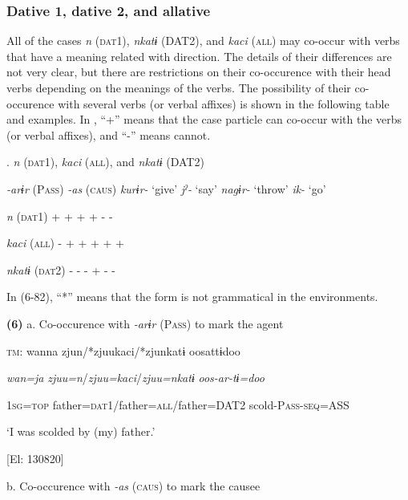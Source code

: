\subsubsection{Dative 1, dative 2, and allative}

All of the cases \textit{n} (\textsc{dat}1), \textit{nkatɨ} (DAT2), and \textit{kaci} (\textsc{all}) may co-occur with verbs that have a meaning related with direction. The details of their differences are not very clear, but there are restrictions on their co-occurence with their head verbs depending on the meanings of the verbs. The possibility of their co-occurence with several verbs (or verbal affixes) is shown in the following table and examples. In , “+” means that the case particle can co-occur with the verbs (or verbal affixes), and “-” means cannot.

\begin{styleBeschriftung}
\textmd{}\textmd{.} \textmd{\textit{n}}\textmd{ (\textsc{dat}1),} \textmd{\textit{kaci}}\textmd{ (\textsc{all}), and} \textmd{\textit{nkatɨ}}\textmd{ (DAT2)}
\end{styleBeschriftung}

    \textit{{}-arɨr} (P\textsc{ass})  \textit{{}-as} (\textsc{caus})  \textit{kurɨr-} ‘give’  \textit{jˀ-} ‘say’  \textit{nagɨr-} ‘throw’  \textit{ik-} ‘go’

\textit{n}  (\textsc{dat}1)  +  +  +  +  {}-  {}-

\textit{kaci}  (\textsc{all})  {}-  +  +  +  +  +

\textit{nkatɨ}  (\textsc{dat}2)  {}-  {}-  {}-  +  {}-  {}-

In (6-82), “*” means that the form is not grammatical in the environments.

\textbf{(6)}  a. Co-occurence with \textit{{}-arɨr} (P\textsc{ass}) to mark the agent

  \textsc{tm}:  wanna  zjun/*zjuukaci/*zjunkatɨ  oosattɨdoo

    \textit{wan=ja}  \textit{zjuu=n}/\textit{zjuu=kaci}/\textit{zjuu=nkatɨ}  \textit{oos-ar-tɨ=doo}

    1\textsc{sg}=\textsc{top}  father=\textsc{dat}1/father=\textsc{all}/father=DAT2  scold-P\textsc{ass}-\textsc{seq}=ASS

    ‘I was scolded by (my) father.’

    [El: 130820]

  b. Co-occurence with \textit{{}-as} (\textsc{caus}) to mark the causee

